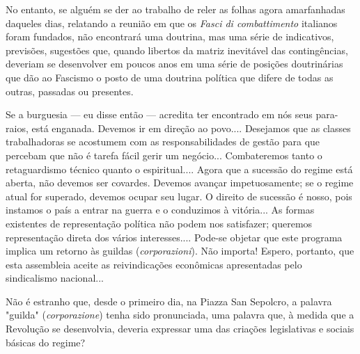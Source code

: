 \documentclass[12pt]{article}
\begin{document}
No entanto, se alguém se der ao trabalho de reler as folhas agora amarfanhadas daqueles dias, relatando a reunião em que os \textit{Fasci di combattimento} italianos foram fundados, não encontrará uma doutrina, mas uma série de indicativos, previsões, sugestões que, quando libertos da matriz inevitável das contingências, deveriam se desenvolver em poucos anos em uma série de posições doutrinárias que dão ao Fascismo o posto de uma doutrina política que difere de todas as outras, passadas ou presentes.

Se a burguesia — eu disse então — acredita ter encontrado em nós seus para-raios, está enganada. Devemos ir em direção ao povo.... Desejamos que as classes trabalhadoras se acostumem com as responsabilidades de gestão para que percebam que não é tarefa fácil gerir um negócio... Combateremos tanto o retaguardismo técnico quanto o espiritual.... Agora que a sucessão do regime está aberta, não devemos ser covardes. Devemos avançar impetuosamente; se o regime atual for superado, devemos ocupar seu lugar. O direito de sucessão é nosso, pois instamos o país a entrar na guerra e o conduzimos à vitória... As formas existentes de representação política não podem nos satisfazer; queremos representação direta dos vários interesses.... Pode-se objetar que este programa implica um retorno às guildas (\textit{corporazioni}). Não importa! Espero, portanto, que esta assembleia aceite as reivindicações econômicas apresentadas pelo sindicalismo nacional...

Não é estranho que, desde o primeiro dia, na Piazza San Sepolcro, a palavra "guilda" (\textit{corporazione}) tenha sido pronunciada, uma palavra que, à medida que a Revolução se desenvolvia, deveria expressar uma das criações legislativas e sociais básicas do regime?
\end{document}
